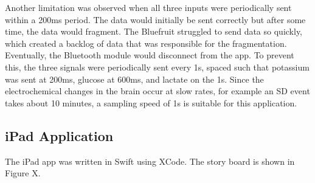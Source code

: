Another limitation was observed when all three inputs were periodically sent within a 200ms period. The data would initially be sent correctly but after some time, the data would fragment. The Bluefruit struggled to send data so quickly, which created a backlog of data that was responsible for the fragmentation. Eventually, the Bluetooth module would disconnect from the app. To prevent this, the three signals were periodically sent every 1s, spaced such that potassium was sent at 200ms, glucose at 600ms, and lactate on the 1s. Since the electrochemical changes in the brain occur at slow rates, for example an SD event takes about 10 minutes, a sampling speed of 1s is suitable for this application. 





\subsection{iPad Application}
The iPad app was written in Swift using XCode. The story board is shown in Figure X.
